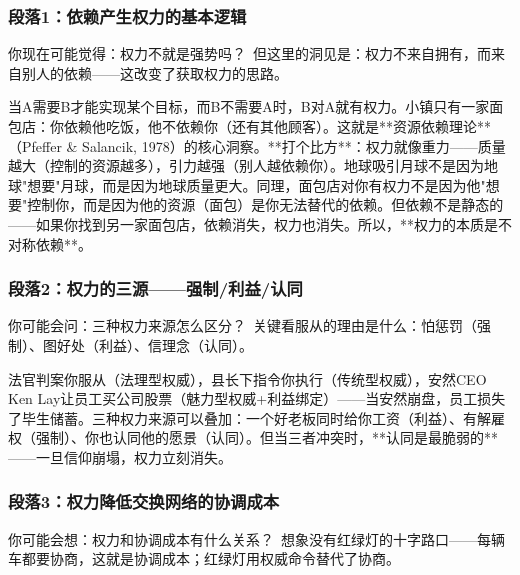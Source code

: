\documentclass[a4paper,12pt]{book}
\newenvironment{motivation}{\begin{tcolorbox}[colback=gray!10,colframe=gray!60,title=\textit{本章动机},fonttitle=\bfseries,arc=0mm,leftrule=3mm]\small\itshape}{\end{tcolorbox}}
\begin{document}
\begin{motivation}
\begin{motivation}
\begin{motivation}
	\subsubsection*{段落1：依赖产生权力的基本逻辑}

	\begin{tcolorbox}[colback=yellow!5, title=\textit{读者行为预测}]
		你现在可能觉得：权力不就是强势吗？\ 但这里的洞见是：权力不来自拥有，而来自别人的依赖——这改变了获取权力的思路。
	\end{tcolorbox}

当A需要B才能实现某个目标，而B不需要A时，B对A就有权力。小镇只有一家面包店：你依赖他吃饭，他不依赖你（还有其他顾客）。这就是**资源依赖理论**（Pfeffer \& Salancik, 1978）的核心洞察。**打个比方**：权力就像重力——质量越大（控制的资源越多），引力越强（别人越依赖你）。地球吸引月球不是因为地球"想要"月球，而是因为地球质量更大。同理，面包店对你有权力不是因为他"想要"控制你，而是因为他的资源（面包）是你无法替代的依赖。但依赖不是静态的——如果你找到另一家面包店，依赖消失，权力也消失。所以，**权力的本质是不对称依赖**。

	\subsubsection*{段落2：权力的三源——强制/利益/认同}

	\begin{tcolorbox}[colback=yellow!5, title=\textit{读者行为预测}]
		你可能会问：三种权力来源怎么区分？\ 关键看服从的理由是什么：怕惩罚（强制）、图好处（利益）、信理念（认同）。
	\end{tcolorbox}

法官判案你服从（法理型权威），县长下指令你执行（传统型权威），安然CEO Ken Lay让员工买公司股票（魅力型权威+利益绑定）——当安然崩盘，员工损失了毕生储蓄。三种权力来源可以叠加：一个好老板同时给你工资（利益）、有解雇权（强制）、你也认同他的愿景（认同）。但当三者冲突时，**认同是最脆弱的**——一旦信仰崩塌，权力立刻消失。

	\subsubsection*{段落3：权力降低交换网络的协调成本}

	\begin{tcolorbox}[colback=yellow!5, title=\textit{读者行为预测}]
		你可能会想：权力和协调成本有什么关系？\ 想象没有红绿灯的十字路口——每辆车都要协商，这就是协调成本；红绿灯用权威命令替代了协商。
	\end{tcolorbox}


\end{motivation}
\end{motivation}
\end{motivation}
\end{document}
